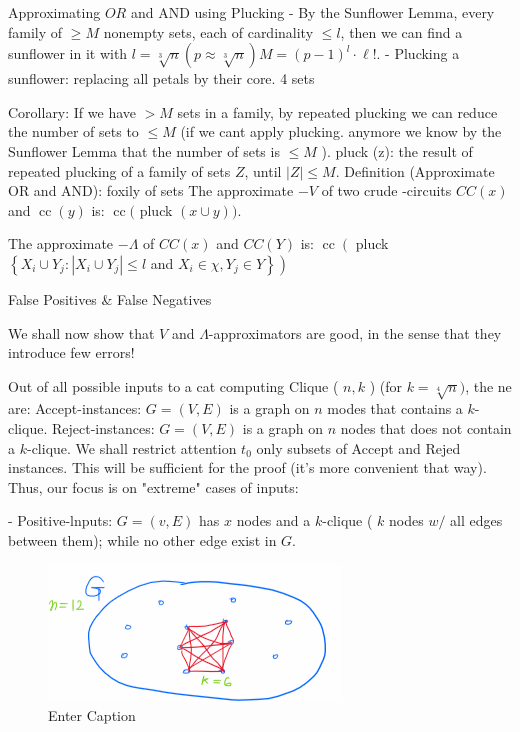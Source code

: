 Approximating $O R$ and AND using Plucking
- By the Sunflower Lemma, every family of $\geqslant M$ nonempty sets, each of cardinality $\leqslant l$, then we can find a sunflower in it with $l=\sqrt[3]{n}(p \approx \sqrt[3]{n}) M=(p-1)^l \cdot \ell!$.
- Plucking a sunflower: replacing all petals by their core. 4 sets

Corollary: If we have $>M$ sets in a family, by repeated plucking we can reduce the number of sets to $\leq M$ (if we cant apply plucking. anymore we know by the Sunflower Lemma that the number of sets is $\leqslant M$ ).
pluck (z): the result of repeated plucking of a family of sets $Z$, until $|Z| \leqslant M$.
Definition (Approximate OR and AND): foxily of sets The approximate $-V$ of two crude -circuits $C C(x)$ and $\operatorname{cc}(y)$ is: $\operatorname{cc}($ pluck $(x \cup y))$.

The approximate $-\Lambda$ of $C C(x)$ and $C C(Y)$ is: $\operatorname{cc}\left(\right.$ pluck $\left\{X_i \cup Y_j:\left|X_i \cup Y_j\right| \leqslant l\right.$ and $\left.\left.X_i \in \chi, Y_j \in Y\right\}\right)$





False Positives \& False Negatives

We shall now show that $V$ and $\Lambda$-approximators are good, in the sense that they introduce few errors!

Out of all possible inputs to a cat computing Clique ( $n, k$ ) (for $k=\sqrt[4]{n})$, the ne are:
Accept-instances: $G=(V, E)$ is a graph on $n$ modes that contains a $k$-clique.
Reject-instances: $G=(V, E)$ is a graph on $n$ nodes that does not contain a $k$-clique.
We shall restrict attention $t_0$ only subsets of Accept and Rejed instances. This will be sufficient for the proof (it's more convenient that way). Thus, our focus is on "extreme" cases of inputs:



- Positive-lnputs: $G=(v, E)$ has $x$ nodes and a $k$-clique ( $k$ nodes $w /$ all edges between them); while no other edge exist in $G$.

\begin{figure}[H]
    \centering
    \includegraphics[width=.5\linewidth]{images/clique1.png}
    \caption{Enter Caption}
    \label{fig:enter-label}
\end{figure}


